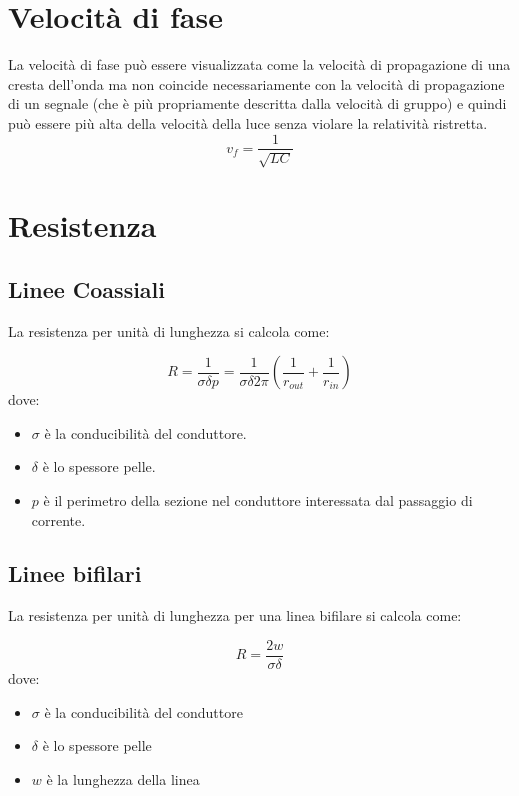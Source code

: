 \documentclass[10pt,a4paper]{report}
\begin{document}
	\section{Velocità di fase}
			 La velocità di fase può essere visualizzata come la velocità di propagazione di una cresta dell'onda ma non coincide necessariamente con la velocità di propagazione di un segnale (che è più propriamente descritta dalla velocità di gruppo) e quindi può essere più alta della velocità della luce senza violare la relatività ristretta.
			\begin{equation}
				v_f=\frac{1}{\sqrt{LC}}
			\end{equation}

	\section{Resistenza}

		\subsection{Linee Coassiali}

			La resistenza per unità di lunghezza si calcola come:

			\begin{equation}R=\frac{1}{\sigma \delta p}=\frac{1}{\sigma \delta 2 \pi}(\frac{1}{r_{out}}+\frac{1}{r_{in}})\end{equation}
			dove:
			
			\begin{itemize}
			\item $\sigma$ è la conducibilità del conduttore.
			\item $\delta$ è lo spessore pelle.
			\item $p$ è il perimetro della sezione nel conduttore interessata dal passaggio di corrente.
			\end{itemize}

		\subsection{Linee bifilari}

				La resistenza per unità di lunghezza per una linea bifilare si calcola come:

				\begin{equation}R=\frac{2w}{\sigma \delta}\end{equation}
				dove:
				
				\begin{itemize}
				\item $\sigma$ è la conducibilità del conduttore
				\item $\delta$ è lo spessore pelle
				\item $w$ è la lunghezza della linea
				\end{itemize}
\end{document}

